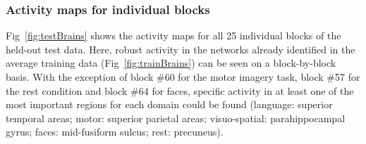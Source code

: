 \documentclass[fleqn,10pt]{SelfArx} %
\begin{document}
\subsubsection*{Activity maps for individual blocks}

Fig~\ref{fig:testBrains} shows the activity maps for all 25 individual blocks of the held-out test data. Here, robust activity in the networks already identified in the average training data (Fig~\ref{fig:trainBrains}) can be seen on a block-by-block basis. With the exception of block \#60 for the motor imagery task, block \#57 for the rest condition and block \#64 for faces, specific activity in at least one of the most important regions for each domain could be found (language: superior temporal areas; motor: superior parietal areas; visuo-spatial: parahippocampal gyrus; faces: mid-fusiform sulcus; rest: precuneus).
\end{document}
